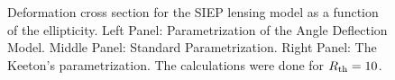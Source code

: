 \begin{figure}[!ht]
{}
\caption{\label{dcs_siep_e} Deformation cross section for the  SIEP lensing
model as a function of the ellipticity. Left Panel:
Parametrization of the Angle Deflection Model. Middle Panel: Standard
Parametrization. Right Panel: The Keeton's parametrization. The calculations
were done for $R_{\rm th}=10$.}
\end{figure}

